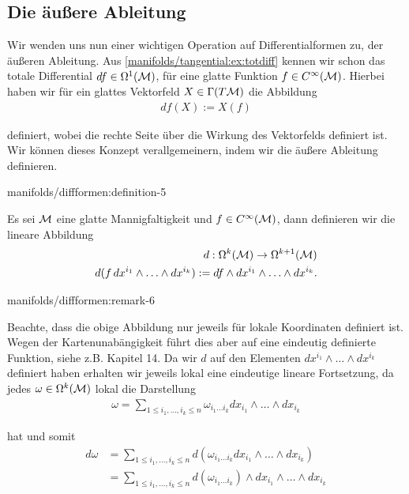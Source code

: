 \subsection{Die äußere Ableitung}
\label{\detokenize{manifolds/diffformen:die-auszere-ableitung}}
\par
Wir wenden uns nun einer wichtigen Operation auf Differentialformen zu, der äußeren Ableitung. Aus \cref{manifolds/tangential:ex:totdiff} kennen wir schon das totale Differential \(df\in \Omega^1(\mathcal{M})\), für eine glatte Funktion \(f\in C^\infty(\mathcal{M})\). Hierbei haben wir für ein glattes Vektorfeld \(X\in \Gamma(T\mathcal{M})\) die Abbildung
\begin{align*}
df(X) := X(f)
\end{align*}
\par
definiert, wobei die rechte Seite über die Wirkung des Vektorfelds definiert ist. Wir können dieses Konzept verallgemeinern, indem wir die äußere Ableitung definieren.
\begin{definition}{}{manifolds/diffformen:definition-5}



\par
Es sei \(\mathcal{M}\) eine glatte Mannigfaltigkeit und \(f\in C^\infty(\mathcal{M})\), dann definieren wir die lineare Abbildung
\begin{align*}
d:\Omega^k(\mathcal{M})\to \Omega^{k+1}(\mathcal{M})\\
d(f\, dx^{i_1}\wedge\ldots\wedge dx^{i_k}):= df \wedge dx^{i_1}\wedge\ldots\wedge dx^{i_k}.
\end{align*}\end{definition}
\begin{remark}{}{manifolds/diffformen:remark-6}



\par
Beachte, dass die obige Abbildung nur jeweils für lokale Koordinaten definiert ist. Wegen der Kartenunabängigkeit führt dies aber auf eine eindeutig definierte Funktion, siehe z.B. \cite{Lee03} Kapitel 14. Da wir \(d\) auf den Elementen \(dx^{i_1}\wedge\ldots\wedge dx^{i_k}\) definiert haben erhalten wir jeweils lokal eine eindeutige lineare Fortsetzung, da jedes \(\omega\in \Omega^k(\mathcal{M})\) lokal die Darstellung
\begin{align*}
\omega = \sum_{1\leq i_1,\ldots,i_k \leq n}\omega_{i_1\ldots i_k}
dx_{i_1}\wedge\ldots\wedge dx_{i_k}
\end{align*}
\par
hat und somit
\begin{align*}
d\omega &= \sum_{1\leq i_1,\ldots,i_k \leq n} d(\omega_{i_1\ldots i_k}
dx_{i_1}\wedge\ldots\wedge dx_{i_k})\\ 
&= \sum_{1\leq i_1,\ldots,i_k \leq n} d(\omega_{i_1\ldots i_k})\wedge
dx_{i_1}\wedge\ldots\wedge dx_{i_k}
\end{align*}\end{remark}

